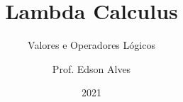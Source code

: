 \title{Lambda Calculus}
\subtitle{Valores e Operadores Lógicos}
\date{2021}
\author{Prof. Edson Alves}
